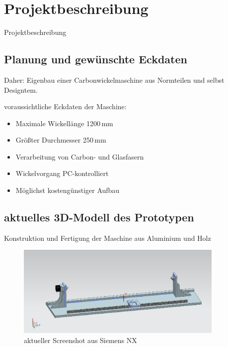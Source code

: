 \documentclass[12pt]{beamer}
\begin{document}
\section{Projektbeschreibung}
\begin{frame}{Projektbeschreibung}
\subsection{Planung und gewünschte Eckdaten}
Daher: Eigenbau einer Carbonwickelmaschine aus Normteilen und selbst Designtem.\newline
\vspace{0.5cm}


voraussichtliche Eckdaten der Maschine:
\begin{itemize}
	\item Maximale Wickellänge 1200\,mm
	\item Größter Durchmesser 250\,mm
	\item Verarbeitung von Carbon- und Glasfasern
	\item Wickelvorgang PC-kontrolliert
	\item Möglichst kostengünstiger Aufbau
\end{itemize}
\end{frame}


\begin{frame}
\subsection{aktuelles 3D-Modell des Prototypen}
Konstruktion und Fertigung der Maschine aus Aluminium und Holz\newline

\begin{figure}
	\includegraphics[width=10cm]{./carbonwickler_geschnitten.png}
	\caption{aktueller Screenshot aus Siemens NX}
\end{figure}
\end{frame}
\end{document}
